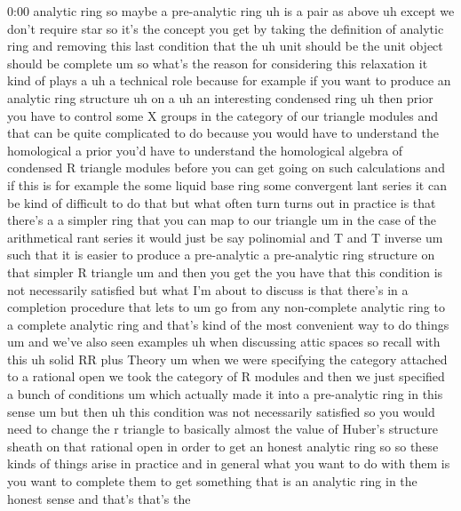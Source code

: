 \begin{unfinished}{0:00}
analytic  ring  so  maybe  a  pre-analytic
ring  uh  is  a
pair  as
above  uh  except  we  don't
require  star  so  it's  the  concept  you  get
by  taking  the  definition  of  analytic
ring  and  removing  this  last  condition
that  the  uh  unit  should  be  the  unit
object  should  be
complete
um  so  what's  the  reason  for  considering
this  relaxation  it  kind  of  plays  a  uh  a
technical  role  because  for  example  if
you  want  to  produce  an  analytic  ring
structure  uh  on
a  uh  an  interesting  condensed  ring  uh
then  prior  you  have  to  control  some  X
groups  in  the  category  of  our  triangle
modules  and  that  can  be  quite
complicated  to  do  because  you  would  have
to  understand  the  homological  a  prior
you'd  have  to  understand  the  homological
algebra  of  condensed  R  triangle  modules
before  you  can  get  going  on  such
calculations  and  if  this  is  for  example
the  some  liquid  base  ring  some
convergent  lant  series  it  can  be  kind  of
difficult  to  do
that  but  what  often  turn  turns  out  in
practice  is  that  there's  a  a  simpler
ring  that  you  can  map  to  our  triangle  um
in  the  case  of  the  arithmetical  rant
series  it  would  just  be  say  polinomial
and  T  and  T  inverse  um  such  that  it  is
easier  to  produce  a  pre-analytic  a
pre-analytic  ring  structure  on  that
simpler  R  triangle  um  and  then  you  get
the  you  have  that  this  condition  is  not
necessarily  satisfied  but  what  I'm  about
to  discuss  is  that  there's  in  a
completion  procedure  that  lets  to  um  go
from  any  non-complete  analytic  ring  to  a
complete  analytic  ring  and  that's  kind
of  the  most  convenient  way  to  do
things  um  and  we've  also  seen  examples
uh  when  discussing  attic
spaces  so  recall  with  this  uh  solid  RR
plus
Theory  um  when  we  were
specifying  the  category  attached  to  a
rational  open  we  took  the  category  of  R
modules  and  then  we  just  specified  a
bunch  of  conditions  um  which  actually
made  it  into  a  pre-analytic  ring  in  this
sense  um  but
then  uh  this  condition  was  not
necessarily  satisfied  so  you  would  need
to  change  the  r  triangle  to  basically
almost  the  value  of  Huber's  structure
sheath  on  that  rational  open  in  order  to
get  an  honest  analytic  ring  so  so  these
kinds  of  things  arise  in  practice  and  in
general  what  you  want  to  do  with  them  is
you  want  to  complete  them  to  get
something  that  is  an  analytic  ring  in
the  honest  sense  and  that's  that's  the

\end{unfinished}
